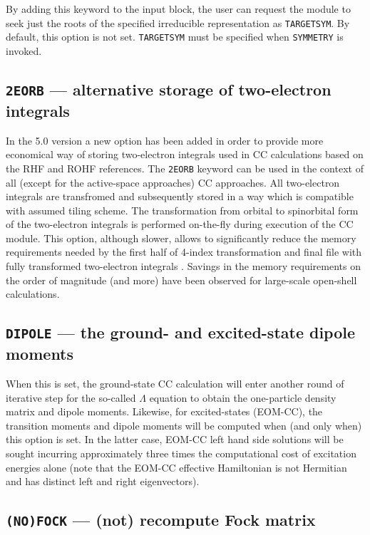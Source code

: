 By adding this keyword to the input block, the user can request the module to
seek just the roots of the specified irreducible representation as 
\verb+TARGETSYM+.  By default, this option is not set.
\verb+TARGETSYM+ must be specified when \verb+SYMMETRY+ is invoked.

\subsection{{\tt 2EORB} --- alternative storage of two-electron integrals}

In the 5.0 version a new option has been added in order to provide more economical 
way of  storing two-electron integrals used in CC calculations based on the  RHF and ROHF 
references. The {\tt 2EORB} keyword can be used in the context of all 
(except for the active-space approaches) CC approaches. All two-electron integrals are
transfromed and subsequently stored in a way which is compatible with assumed tiling scheme. 
The transformation from orbital to spinorbital form of the two-electron integrals is 
performed on-the-fly during execution of the CC module. This option, although slower, allows  
to significantly reduce the memory requirements needed by  the first half of 4-index 
transformation and final file with fully transformed two-electron integrals . 
Savings  in the memory requirements
on the order of magnitude (and more)
have been observed for large-scale open-shell calculations.


\subsection{{\tt DIPOLE} --- the ground- and excited-state dipole moments}

When this is set, the ground-state CC calculation will enter another round 
of iterative step for the so-called $\Lambda$ equation to obtain the one-particle
density matrix and dipole moments.  Likewise, for excited-states (EOM-CC), the 
transition moments and dipole moments will be computed when (and only when) this
option is set.  In the latter case, EOM-CC left hand side solutions will be sought
incurring approximately three times the computational cost of excitation energies 
alone (note that the EOM-CC effective Hamiltonian is not Hermitian and has distinct
left and right eigenvectors).

\subsection{{\tt (NO)FOCK} --- (not) recompute Fock matrix}

